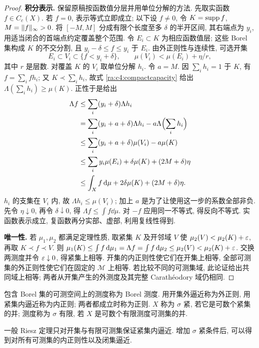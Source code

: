 \begin{proof}
\textbf{积分表示.} 保留原稿按函数值分层并用单位分解的方法. 先取实函数 $f\in C_c(X)$. 若 $f=0$, 表示等式立即成立; 以下设 $f\ne0$, 令 $K=\operatorname{supp} f$, $M=\lVert f\rVert_\infty>0$. 将 $[-M,M]$ 分成有限个长度至多 $\delta$ 的半开区间, 其右端点为 $y_i$, 用适当闭合的首端点约定覆盖整个范围. 令 $E_i\subset K$ 为相应函数值层; 这些 Borel 集构成 $K$ 的不交分割, 且 $y_i-\delta\le f\le y_i$ 于 $E_i$. 由外正则性与连续性, 可选开集
\[
 E_i\subset V_i\subset\{f<y_i+\delta\},
 \qquad \mu(V_i)<\mu(E_i)+\eta/r,
\]
其中 $r$ 是层数. 对覆盖 $K$ 的 $V_i$ 取单位分解 $h_i$. 令 $a=M$. 因 $\sum_ih_i=1$ 于 $K$, 有 $f=\sum_ifh_i$; 又 $K\prec\sum_ih_i$, 故式 \eqref{ra:c4:compactcapacity} 给出 $\Lambda(\sum_ih_i)\ge\mu(K)$. 正性于是给出
\begin{align*}
 \Lambda f
 &\le\sum_i(y_i+\delta)\Lambda h_i\\
 &=\sum_i(y_i+a+\delta)\Lambda h_i-a\Lambda\Bigl(\sum_ih_i\Bigr)\\
 &\le\sum_i(y_i+a+\delta)\mu(V_i)-a\mu(K)\\
 &\le\sum_iy_i\mu(E_i)+\delta\mu(K)+(2M+\delta)\eta\\
 &\le\int_X f\,\mathrm d\mu+2\delta\mu(K)+(2M+\delta)\eta.
\end{align*}
$h_i$ 的支集在 $V_i$ 内, 故 $\Lambda h_i\le\mu(V_i)$; 加上 $a$ 是为了让使用这一步的系数全部非负. 先令 $\eta\downarrow0$, 再令 $\delta\downarrow0$, 得 $\Lambda f\le\int f\dd\mu$. 对 $-f$ 应用同一不等式, 得反向不等式. 实函数表示成立, 复函数再分实部、虚部, 利用复线性得到.

\textbf{唯一性.} 若 $\mu_1,\mu_2$ 都满足定理性质, 取紧集 $K$ 及开邻域 $V$ 使 $\mu_2(V)<\mu_2(K)+\varepsilon$, 再取 $K\prec f\prec V$. 则 $\mu_1(K)\le\int f\,\mathrm d\mu_1=\Lambda f=\int f\,\mathrm d\mu_2\le\mu_2(V)<\mu_2(K)+\varepsilon$. 交换两测度并令 $\varepsilon\downarrow0$, 得紧集上相等. 开集的内正则性使它们在开集上相等, 全部可测集的外正则性使它们在固定的 $\mathcal M$ 上相等. 若比较不同的可测集域, 此论证给出共同域上相等; 两者从开集产生的外测度及其完整 Carath\'eodory 域仍相同.
\end{proof}

\begin{definition}\label{ra:c4:regularity}
包含 Borel 集的可测空间上的测度称为 Borel 测度. 用开集外逼近称为外正则, 用紧集内逼近称为内正则; 两者都成立时称为正则. $X$ 称为 $\sigma$ 紧, 若它是可数个紧集的并; 测度称为 $\sigma$ 有限, 若 $X$ 是可数个有限测度可测集的并.
\end{definition}

一般 Riesz 定理只对开集与有限可测集保证紧集内逼近. 增加 $\sigma$ 紧条件后, 可以得到对所有可测集的内正则性以及闭集逼近.

